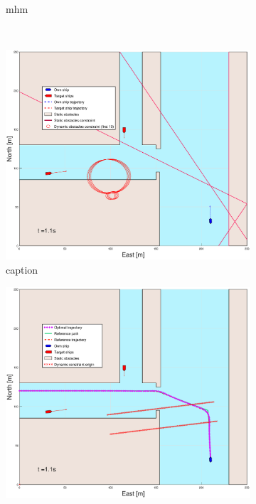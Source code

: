 \begin{figure}[!ht]
\begin{subfigure}[b]{0.499\textwidth}
        \caption{mhm}
    \end{subfigure}
    \hfill
    \\
    \begin{subfigure}[b]{0.49\textwidth}
        \centering
        \includegraphics[width=\textwidth]{Images/Figures/Havn1/_Simple_1fig1_time=1}
        \caption{caption}
    \end{subfigure}
    \hfill
    \begin{subfigure}[b]{0.499\textwidth}
        \centering
        \includegraphics[width=\textwidth]{Images/Figures/Havn1/_Simple_1fig999_time=1}

\end{subfigure}
\end{figure}
